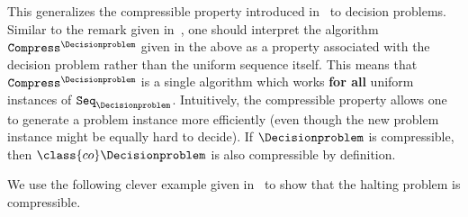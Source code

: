 This generalizes the compressible property introduced in~ to decision problems. Similar to the remark given in~, one should interpret the algorithm $\texttt{Compress}^{\Decisionproblem}$ given in the above as a property associated with the decision problem rather than the uniform sequence itself. This means that $\texttt{Compress}^{\Decisionproblem}$ is a single algorithm which works \textbf{for all} uniform instances of $\texttt{Seq}_{\Decisionproblem}$. Intuitively, the compressible property allows one to generate a problem instance more efficiently (even though the new problem instance might be equally hard to decide). If $\Decisionproblem$ is compressible, then $\class{co}\Decisionproblem$ is also compressible by definition. 

We use the following clever example given in~\cite{nezhadiRecursiveCompressionMethod2025} to show that the halting problem is compressible. 

